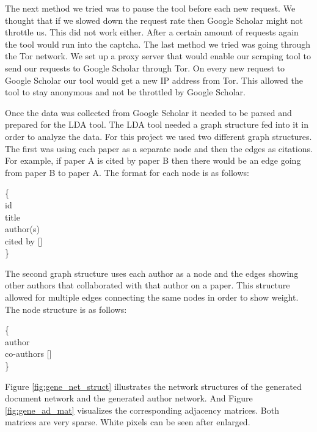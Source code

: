 \documentclass[letterpaper]{article}
\begin{document}
The next method we tried was to pause the tool before each new request.
We thought that if we slowed down the request rate then Google Scholar might not throttle us.
This did not work either. After a certain amount of requests again the tool would run into the captcha.
The last method we tried was going through the Tor network.
We set up a proxy server that would enable our scraping tool to send our requests to Google Scholar through Tor.
On every new request to Google Scholar our tool would get a new IP address from Tor.
This allowed the tool to stay anonymous and not be throttled by Google Scholar.

Once the data was collected from Google Scholar it needed to be parsed and prepared for the LDA tool.
The LDA tool needed a graph structure fed into it in order to analyze the data.
For this project we used two different graph structures.
The first was using each paper as a separate node and then the edges as citations.
For example, if paper A is cited by paper B then there would be an edge going from paper B to paper A.
The format for each node is as follows:
\begin{framed}
\noindent
\{\\
\indent\indent id \\
\indent\indent title \\
\indent\indent author(s) \\
\indent\indent cited by []\\
\}
\end{framed}

The second graph structure uses each author as a node and the edges showing other authors that collaborated with that author on a paper.
This structure allowed for multiple edges connecting the same nodes in order to show weight.
The node structure is as follows:
\begin{framed}
\noindent
\{\\
\indent\indent author \\
\indent\indent co-authors [] \\
\}
\end{framed}

Figure \ref{fig:gene_net_struct} illustrates the network structures of the generated document network and the generated author network.
And Figure \ref{fig:gene_ad_mat} visualizes the corresponding adjacency matrices.
Both matrices are very sparse.
White pixels can be seen after enlarged.
\end{document}
